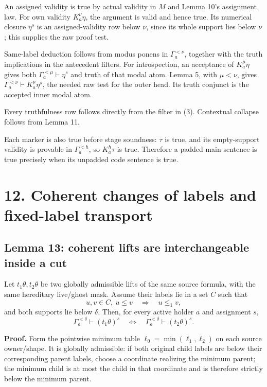 \documentclass[
  11pt,
  letterpaper,
]{article}
\begin{document}
An assigned validity is true by actual validity in \(M\) and Lemma 10's
assignment law. For own validity \(K_a^\nu\eta\), the argument is valid
and hence true. Its numerical closure \(\eta^s\) is an assigned-validity
row below \(\nu\), since its whole support lies below \(\nu\); this
supplies the raw proof test.

Same-label deduction follows from modus ponens in \(\Gamma_a^{<\nu}\),
together with the truth implications in the antecedent filters. For
introspection, an acceptance of \(K_a^\mu\eta\) gives both
\(\Gamma_a^{<\mu}\vdash\eta^s\) and truth of that modal atom. Lemma 5,
with \(\mu<\nu\), gives \(\Gamma_a^{<\nu}\vdash K_a^\mu\eta^s\), the
needed raw test for the outer head. Its truth conjunct is the accepted
inner modal atom.

Every truthfulness row follows directly from the filter in (3).
Contextual collapse follows from Lemma 11.

Each marker is also true before stage soundness: \(\tau\) is true, and
its empty-support validity is provable in \(\Gamma_a^{<h}\), so
\(K_a^h\tau\) is true. Therefore a padded main sentence is true
precisely when its unpadded code sentence is true.

\section{12. Coherent changes of labels and fixed-label
transport}\label{coherent-changes-of-labels-and-fixed-label-transport}

\subsection{Lemma 13: coherent lifts are interchangeable inside a
cut}\label{lemma-13-coherent-lifts-are-interchangeable-inside-a-cut}

Let \(t_1\theta,t_2\theta\) be two globally admissible lifts of the same
source formula, with the same hereditary live/ghost mask. Assume their
labels lie in a set \(C\) such that \[
u,v\in C,\ u\leq v\quad\Longrightarrow\quad u\leq_1v,
\] and both supports lie below \(\delta\). Then, for every active holder
\(a\) and assignment \(s\), \[
\Gamma_a^{<\delta}\vdash(t_1\theta)^s
\quad\Longleftrightarrow\quad
\Gamma_a^{<\delta}\vdash(t_2\theta)^s.
\]

\textbf{Proof.} Form the pointwise minimum table
\(\ell_0=\min(\ell_1,\ell_2)\) on each source owner/shape. It is
globally admissible: if both original child labels are below their
corresponding parent labels, choose a coordinate realizing the minimum
parent; the minimum child is at most the child in that coordinate and is
therefore strictly below the minimum parent.
\end{document}
